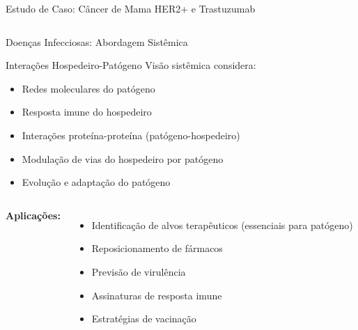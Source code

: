 \begin{frame}{Estudo de Caso: Câncer de Mama HER2+ e Trastuzumab}
\begin{columns}
\begin{center}
\end{center}

\vspace{0.3cm}

\end{columns}
\end{frame}

\begin{frame}{Doenças Infecciosas: Abordagem Sistêmica}
\begin{block}{Interações Hospedeiro-Patógeno}
Visão sistêmica considera:
\begin{itemize}
    \item Redes moleculares do patógeno
    \item Resposta imune do hospedeiro
    \item Interações proteína-proteína (patógeno-hospedeiro)
    \item Modulação de vias do hospedeiro por patógeno
    \item Evolução e adaptação do patógeno
\end{itemize}
\end{block}

\vspace{0.3cm}

\begin{columns}
\textbf{Aplicações:}
\begin{itemize}
    \item Identificação de alvos terapêuticos (essenciais para patógeno)
    \item Reposicionamento de fármacos
    \item Previsão de virulência
    \item Assinaturas de resposta imune
    \item Estratégias de vacinação
\end{itemize}


\end{columns}
\end{frame}
